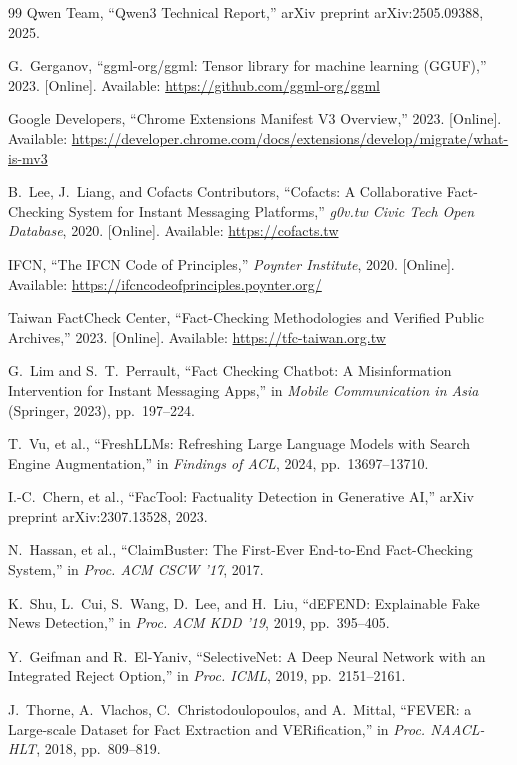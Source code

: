 \documentclass[twoside]{llncs}
\begin{document}
\begin{thebibliography}{99}
Qwen Team, ``Qwen3 Technical Report,'' arXiv preprint arXiv:2505.09388, 2025.

G.~Gerganov, ``ggml-org/ggml: Tensor library for machine learning (GGUF),'' 2023. [Online]. Available: \url{https://github.com/ggml-org/ggml}

Google Developers, ``Chrome Extensions Manifest V3 Overview,'' 2023. [Online]. Available: \url{https://developer.chrome.com/docs/extensions/develop/migrate/what-is-mv3}

B.~Lee, J.~Liang, and Cofacts Contributors, ``Cofacts: A Collaborative Fact-Checking System for Instant Messaging Platforms,'' \emph{g0v.tw Civic Tech Open Database}, 2020. [Online]. Available: \url{https://cofacts.tw}

IFCN, ``The IFCN Code of Principles,'' \emph{Poynter Institute}, 2020. [Online]. Available: \url{https://ifcncodeofprinciples.poynter.org/}

Taiwan FactCheck Center, ``Fact-Checking Methodologies and Verified Public Archives,'' 2023. [Online]. Available: \url{https://tfc-taiwan.org.tw}

G.~Lim and S.~T.~Perrault, ``Fact Checking Chatbot: A Misinformation Intervention for Instant Messaging Apps,'' in \emph{Mobile Communication in Asia} (Springer, 2023), pp.~197--224.

T.~Vu, et al., ``FreshLLMs: Refreshing Large Language Models with Search Engine Augmentation,'' in \emph{Findings of ACL}, 2024, pp.~13697--13710.

I.-C.~Chern, et al., ``FacTool: Factuality Detection in Generative AI,'' arXiv preprint arXiv:2307.13528, 2023.

N.~Hassan, et al., ``ClaimBuster: The First-Ever End-to-End Fact-Checking System,'' in \emph{Proc. ACM CSCW '17}, 2017.

K.~Shu, L.~Cui, S.~Wang, D.~Lee, and H.~Liu, ``dEFEND: Explainable Fake News Detection,'' in \emph{Proc. ACM KDD '19}, 2019, pp.~395--405.

Y.~Geifman and R.~El-Yaniv, ``SelectiveNet: A Deep Neural Network with an Integrated Reject Option,'' in \emph{Proc. ICML}, 2019, pp.~2151--2161.

J.~Thorne, A.~Vlachos, C.~Christodoulopoulos, and A.~Mittal, ``FEVER: a Large-scale Dataset for Fact Extraction and VERification,'' in \emph{Proc. NAACL-HLT}, 2018, pp.~809--819.


\end{thebibliography}
\end{document}
